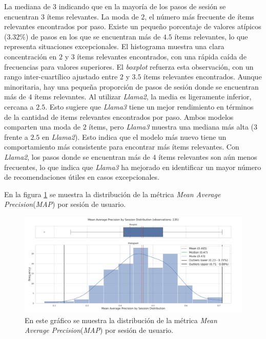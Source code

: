 \documentclass[11pt,a4paper,twoside]{thesis}
\begin{document}
La mediana de $3$ indicando que en la mayoría de los pasos de sesión se encuentran $3$ ítems relevantes. La moda de $2$, el número más frecuente de ítems relevantes encontrados por paso. Existe un pequeño porcentaje de valores atípicos ($3.32\%$) de pasos en los que se encuentran más de $4.5$ ítems relevantes, lo que representa situaciones excepcionales. El histograma muestra una clara concentración en $2$ y $3$ ítems relevantes encontrados, con una rápida caída de frecuencias para valores superiores. El \textit{boxplot} refuerza esta observación, con un rango inter-cuartílico ajustado entre $2$ y $3.5$ ítems relevantes encontrados. Aunque minoritaria, hay una pequeña proporción de pasos de sesión donde se encuentran más de $4$ ítems relevantes.
Al utilizar \textit{Llama2}, la media es ligeramente inferior, cercana a $2.5$. Esto sugiere que \textit{Llama3} tiene un mejor rendimiento en términos de la cantidad de items relevantes encontrados por paso. Ambos modelos comparten una moda de $2$ ítems, pero \textit{Llama3} muestra una mediana más alta ($3$ frente a $2.5$ en \textit{Llama2}). Esto indica que el modelo más nuevo tiene un comportamiento más consistente para encontrar más ítems relevantes.
Con \textit{Llama2}, los pasos donde se encuentran más de $4$ ítems relevantes son aún menos frecuentes, lo que indica que \textit{Llama3} ha mejorado en identificar un mayor número de recomendaciones útiles en casos excepcionales.

\clearpage

En la figura \ref{fig:llama3-mean_average_precision_by_session_distribution} se muestra la distribución de la métrica \textit{Mean Average Precision}(\textit{MAP}) por sesión de usuario.

\begin{figure}[H]
	\centering
	\includegraphics[width=15cm]{./images/llama3/mean_average_precision_by_session_distribution.png}
	\caption{En este gráfico se muestra la distribución de la métrica \textit{Mean Average Precision}(\textit{MAP}) por sesión de usuario.}
	\label{fig:llama3-mean_average_precision_by_session_distribution}
\end{figure}
\end{document}
